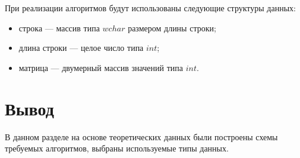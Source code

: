 При реализации алгоритмов будут использованы следующие структуры данных:

\begin{itemize}
	\item строка --- массив типа $wchar$ размером длины строки;
	\item длина строки --- целое число типа $int$;
	\item матрица --- двумерный массив значений типа $int$.
\end{itemize}

\section*{Вывод}

В данном разделе на основе теоретических данных были построены схемы
требуемых алгоритмов, выбраны используемые типы данных.